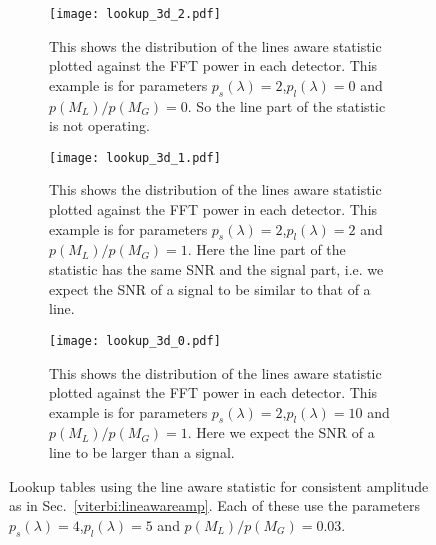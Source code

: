 \begin{figure}
\centering

\begin{subfigure}[h]{\linewidth}
\begin{minipage}{0.65\linewidth}
\texttt{[image: lookup\_3d\_2.pdf]}
\end{minipage}\hfill
\begin{minipage}{0.35\linewidth}
\caption{This shows the distribution of the lines aware statistic plotted against the \ac{FFT} power in each detector. This example is for parameters $p_s(\lambda) = 2$,$p_l(\lambda) = 0$ and $p(M_L)/p(M_G) = 0$. So the line part of the statistic is not operating.}
\label{viterbi:plot:data}
\end{minipage}
\end{subfigure}
\begin{subfigure}[h]{\linewidth}
\begin{minipage}{0.65\linewidth}
\texttt{[image: lookup\_3d\_1.pdf]}
\end{minipage}\hfill
\begin{minipage}{0.35\linewidth}
\caption{This shows the distribution of the lines aware statistic plotted against the \ac{FFT} power in each detector. This example is for parameters $p_s(\lambda) = 2$,$p_l(\lambda) = 2$ and $p(M_L)/p(M_G) = 1$. Here the line part of the statistic has the same \ac{SNR} and the signal part, i.e. we expect the \ac{SNR} of a signal to be similar to that of a line.}
\label{viterbi:plot:data}
\end{minipage}
\end{subfigure}

\begin{subfigure}[h]{\linewidth}
\begin{minipage}{0.65\linewidth}
\texttt{[image: lookup\_3d\_0.pdf]}
\end{minipage}\hfill
\begin{minipage}{0.35\linewidth}
\caption{This shows the distribution of the lines aware statistic plotted against the \ac{FFT} power in each detector. This example is for parameters $p_s(\lambda) = 2$,$p_l(\lambda) = 10$ and $p(M_L)/p(M_G) = 1$. Here we expect the \ac{SNR} of a line to be larger than a signal.}
\label{viterbi:plot:data}
\end{minipage}
\end{subfigure}
\caption{Lookup tables using the line aware statistic for consistent amplitude as in Sec.~\ref{viterbi:lineawareamp}. Each of these use the parameters $p_s(\lambda) = 4$,$p_l(\lambda) = 5$ and $p(M_L)/p(M_G) = 0.03$. }
\label{viterbi:plots}
\end{figure}

